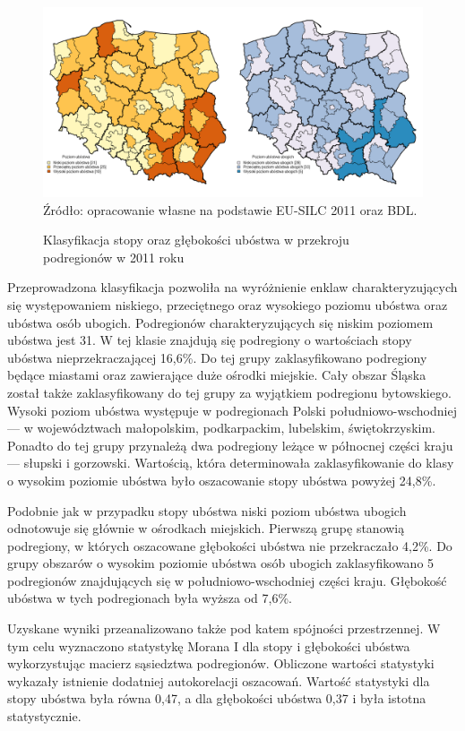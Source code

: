 \begin{figure}[ht]
\caption{Klasyfikacja stopy oraz głębokości ubóstwa w przekroju podregionów w 2011 roku}
\centering
\includegraphics[width=\textwidth]{05_wykresy/fh_nts3_hcr_pgi_k3.png}\\
\small{Źródło: opracowanie własne na podstawie EU-SILC 2011 oraz BDL.}
\label{fig:fh_nts3_hcr_pgi_k3}
\end{figure}

Przeprowadzona klasyfikacja pozwoliła na wyróżnienie enklaw charakteryzujących się występowaniem niskiego, przeciętnego oraz wysokiego poziomu ubóstwa oraz ubóstwa osób ubogich. Podregionów charakteryzujących się niskim poziomem ubóstwa jest 31. W tej klasie znajdują się podregiony o wartościach stopy ubóstwa nieprzekraczającej 16,6\%. Do tej grupy zaklasyfikowano podregiony będące miastami oraz zawierające duże ośrodki miejskie. Cały obszar Śląska został także zaklasyfikowany do tej grupy za wyjątkiem podregionu bytowskiego. Wysoki poziom ubóstwa występuje w podregionach Polski południowo-wschodniej --- w województwach małopolskim, podkarpackim, lubelskim, świętokrzyskim. Ponadto do tej grupy przynależą dwa podregiony leżące w północnej części kraju --- słupski i gorzowski. Wartością, która determinowała zaklasyfikowanie do klasy o wysokim poziomie ubóstwa było oszacowanie stopy ubóstwa powyżej 24,8\%. 

Podobnie jak w przypadku stopy ubóstwa niski poziom ubóstwa ubogich odnotowuje się głównie w ośrodkach miejskich. Pierwszą grupę stanowią podregiony, w których oszacowane głębokości ubóstwa nie przekraczało 4,2\%. Do grupy obszarów o wysokim poziomie ubóstwa osób ubogich zaklasyfikowano 5 podregionów znajdujących się w południowo-wschodniej części kraju. Głębokość ubóstwa w tych podregionach była wyższa od 7,6\%.

Uzyskane wyniki przeanalizowano także pod katem spójności przestrzennej. W tym celu wyznaczono statystykę Morana I dla stopy i głębokości ubóstwa wykorzystując macierz sąsiedztwa podregionów. Obliczone wartości statystyki wykazały istnienie dodatniej autokorelacji oszacowań. Wartość statystyki dla stopy ubóstwa była równa 0,47, a dla głębokości ubóstwa 0,37 i była istotna statystycznie. 

